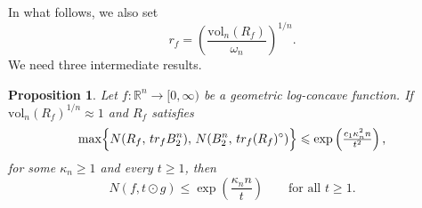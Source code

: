 \documentclass[11pt,leqno]{article}
\newtheorem{proposition}[theorem]{Proposition}
\theoremstyle{definition}
\theoremstyle{remark}
\numberwithin{equation}{section}
\newcommand{\vol}{\mathrm{vol}}
\newcommand{\ls}{\leqslant}
\newcommand{\gr}{\geqslant}
\begin{document}
In what follows, we also set
\begin{equation}\label{eq:r_f}r_f=\left(\frac{\vol_n(R_f)}{\omega_n}\right)^{1/n}.\end{equation}
We need three intermediate results.

\begin{proposition}\label{prop:fcover-1}
Let $f:\mathbb{R}^n\to[0,\infty)$ be a geometric log-concave function.
If $\vol_n(R_f)^{1/n}\approx 1$ and $R_f$ satisfies 
\begin{equation}\max\Bigl\{N(R_f,\, t r_f B_2^n),\,
N(B_2^n,\, t r_f (R_f)^{\circ})\Bigr\}\ls \exp\left( \tfrac{c_1 \kappa_n^2 n}{t^2}\right),
\label{eq:R-covering-a}\end{equation}
for some $\kappa_n\gr 1$ and every $t\gr 1$, then
$$N(f,t\odot g)\ls \exp\!\left(\frac{\kappa_n n}{t}\right)\qquad\text{for all } t\gr 1.$$
\end{proposition}
\end{document}
